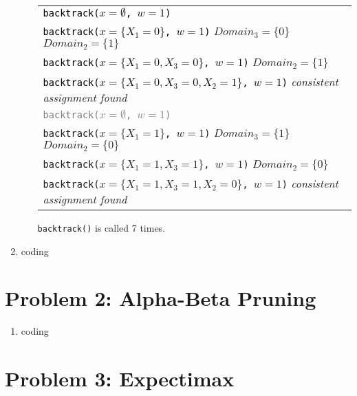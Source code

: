 \documentclass[10pt]{article}
\begin{document}
\begin{enumerate}[label=(\alph*)]
\begin{enumerate}[label=\roman*.]
		\begin{tabular}{l}
		\textcolor{black}{\texttt{backtrack($x = \emptyset$, $w = 1$)}}\\
		\textcolor{black}{\texttt{backtrack($x = \{ X_1 = 0 \}$, $w = 1$)}} $Domain_3 = \{ 0 \}$ $Domain_2 = \{ 1 \}$ \\
		\textcolor{black}{\texttt{backtrack($x = \{ X_1 = 0, X_3 = 0 \}$, $w = 1$)}} $Domain_2 = \{ 1 \}$\\
		\textcolor{black}{\texttt{backtrack($x = \{ X_1 = 0, X_3 = 0, X_2 = 1 \}$, $w = 1$)}} \textit{consistent assignment found}\\
		\hline
		\textcolor{gray}{\texttt{backtrack($x = \emptyset$, $w = 1$)}}\\
		\texttt{backtrack($x = \{ X_1 = 1 \}$, $w = 1$)} $Domain_3 = \{ 1 \}$ $Domain_2 = \{ 0 \}$\\
		\texttt{backtrack($x = \{ X_1 = 1, X_3 = 1 \}$, $w = 1$)} $Domain_2 = \{ 0 \}$\\
		\texttt{backtrack($x = \{ X_1 = 1, X_3 = 1, X_2 = 0 \}$, $w = 1$)} \textit{consistent assignment found}\\
  		\end{tabular}
  		
  		\texttt{backtrack()} is called 7 times.
	\end{enumerate}
	
	\item coding

\end{enumerate}
\iffalse
\section*{\normalsize Problem 2: Alpha-Beta Pruning}

\begin{enumerate}[label=(\alph*)]

  \item coding

\end{enumerate}

\section*{\normalsize Problem 3: Expectimax}
\end{document}
